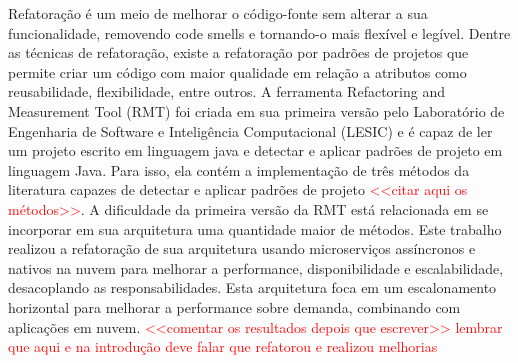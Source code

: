 \begin{Abstract}[brazilian]%
Refatoração é um meio de melhorar o código-fonte sem alterar a sua funcionalidade, removendo code smells e tornando-o mais flexível e legível. Dentre as técnicas de refatoração, existe a refatoração por padrões de projetos que permite criar um código com maior qualidade em relação a atributos como reusabilidade, flexibilidade, entre outros. A ferramenta Refactoring and Measurement Tool (RMT) foi criada em sua primeira versão pelo Laboratório de Engenharia de Software e Inteligência Computacional (LESIC) e é capaz de ler um projeto escrito em linguagem java e detectar e aplicar padrões de projeto em linguagem Java. Para isso, ela contém a implementação de três métodos da literatura capazes de detectar e aplicar padrões de projeto \textcolor{red}{<<citar aqui os métodos>>}. A dificuldade da primeira versão da RMT está relacionada em se incorporar em sua arquitetura uma quantidade maior de métodos. Este trabalho realizou a refatoração de sua arquitetura usando microserviços assíncronos e nativos na nuvem para melhorar a performance, disponibilidade e escalabilidade, desacoplando as responsabilidades. Esta arquitetura foca em um escalonamento horizontal para melhorar a performance sobre demanda, combinando com aplicações em nuvem. \textcolor{red}{<<comentar os resultados depois que escrever>> lembrar que aqui e na introdução deve falar que refatorou e realizou melhorias}
\end{Abstract}
